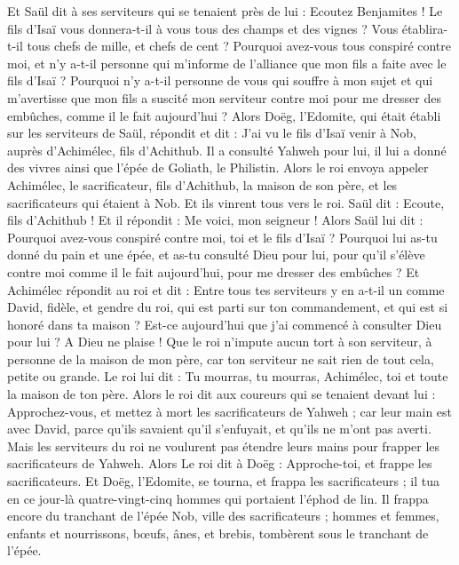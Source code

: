 \begin{multicols}{2}
Et Saül dit à ses serviteurs qui se tenaient près de lui : Ecoutez Benjamites ! Le fils d'Isaï vous donnera-t-il à vous tous des champs et des vignes ? Vous établira-t-il tous chefs de mille, et chefs de cent ?
Pourquoi avez-vous tous conspiré contre moi, et n'y a-t-il personne qui m'informe de l'alliance que mon fils a faite avec le fils d'Isaï ? Pourquoi n'y a-t-il personne de vous qui souffre à mon sujet et qui m'avertisse que mon fils a suscité mon serviteur contre moi pour me dresser des embûches, comme il le fait aujourd'hui ?
Alors Doëg, l'Edomite, qui était établi sur les serviteurs de Saül, répondit et dit : J'ai vu le fils d'Isaï venir à Nob, auprès d'Achimélec, fils d'Achithub.
Il a consulté Yahweh pour lui, il lui a donné des vivres ainsi que l'épée de Goliath, le Philistin.
Alors le roi envoya appeler Achimélec, le sacrificateur, fils d'Achithub, la maison de son père, et les sacrificateurs qui étaient à Nob. Et ils vinrent tous vers le roi.
Saül dit : Ecoute, fils d'Achithub ! Et il répondit : Me voici, mon seigneur !
Alors Saül lui dit : Pourquoi avez-vous conspiré contre moi, toi et le fils d'Isaï ? Pourquoi lui as-tu donné du pain et une épée, et as-tu consulté Dieu pour lui, pour qu'il s'élève contre moi comme il le fait aujourd'hui, pour me dresser des embûches ?
Et Achimélec répondit au roi et dit : Entre tous tes serviteurs y en a-t-il un comme David, fidèle, et gendre du roi, qui est parti sur ton commandement, et qui est si honoré dans ta maison ?
Est-ce aujourd'hui que j'ai commencé à consulter Dieu pour lui ? A Dieu ne plaise ! Que le roi n'impute aucun tort à son serviteur, à personne de la maison de mon père, car ton serviteur ne sait rien de tout cela, petite ou grande.
Le roi lui dit : Tu mourras, tu mourras, Achimélec, toi et toute la maison de ton père.
Alors le roi dit aux coureurs qui se tenaient devant lui : Approchez-vous, et mettez à mort les sacrificateurs de Yahweh ; car leur main est avec David, parce qu'ils savaient qu'il s'enfuyait, et qu'ils ne m'ont pas averti. Mais les serviteurs du roi ne voulurent pas étendre leurs mains pour frapper les sacrificateurs de Yahweh.
Alors Le roi dit à Doëg : Approche-toi, et frappe les sacrificateurs. Et Doëg, l'Edomite, se tourna, et frappa les sacrificateurs ; il tua en ce jour-là quatre-vingt-cinq hommes qui portaient l'éphod de lin.
Il frappa encore du tranchant de l'épée Nob, ville des sacrificateurs ; hommes et femmes, enfants et nourrissons, bœufs, ânes, et brebis, tombèrent sous le tranchant de l'épée.

\end{multicols}
